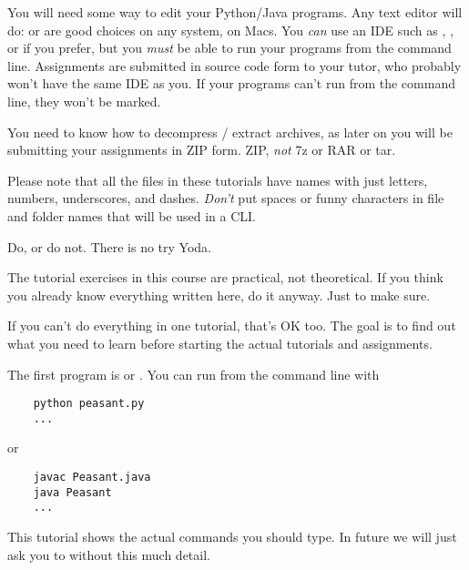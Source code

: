 You will need some way to edit your Python/Java programs. Any text editor will do:
 or  are good choices on any system,  on
Macs. You \emph{can} use an IDE such as , , or 
if you prefer, but you \emph{must} be able to run your programs from the command line.
Assignments are submitted in source code form to your tutor, who probably won't have
the same IDE as you. If your programs can't run from the command line, they won't be
marked.

You need to know how to decompress / extract  archives, as later on you will
be submitting your assignments in ZIP form. ZIP, \emph{not} 7z or RAR or tar.

Please note that all the files in these tutorials have names with just letters, numbers,
underscores, and dashes. \emph{Don't} put spaces or funny characters in file and folder
names that will be used in a CLI.



\begin{IMPORTANT}
Do, or do not. There is no try \DSH Yoda.

The tutorial exercises in this course are practical, not theoretical. If you think
you already know everything written here, do it anyway. Just to make sure.

If you can't do everything in one tutorial, that's OK too. The goal is to find
out what you need to learn before starting the actual tutorials and assignments.
\end{IMPORTANT}

The first program is  or . You can run from the
command line with
\begin{CODE}\begin{verbatim}
    python peasant.py
    ...
\end{verbatim}\end{CODE}
or
\begin{CODE}\begin{verbatim}
    javac Peasant.java
    java Peasant
    ...
\end{verbatim}\end{CODE}

\begin{IMPORTANT}
This tutorial shows the actual commands you should type. In future we will just ask you
to  without this much detail.
\end{IMPORTANT}

